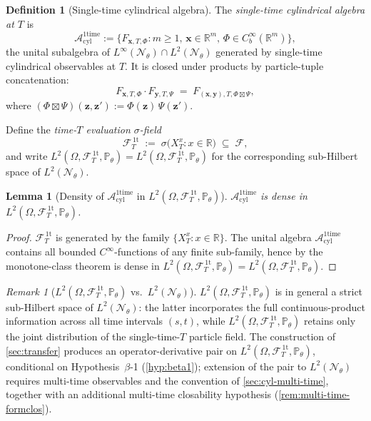 \documentclass[11pt,reqno]{amsart}
\theoremstyle{plain}
\newtheorem{lemma}[theorem]{Lemma}
\theoremstyle{definition}
\newtheorem{definition}[theorem]{Definition}
\theoremstyle{remark}
\newtheorem{remark}[theorem]{Remark}
\newcommand{\R}{\mathbb R}
\newcommand{\Prob}{\mathbb P}
\newcommand{\cA}{\mathcal A}
\newcommand{\cF}{\mathcal F}
\newcommand{\cN}{\mathcal N}
\newcommand{\Aone}{\cA_{\mathrm{cyl}}^{\mathrm{1time}}}
\newcommand{\FT}{\cF_{T}^{\,\mathrm{1t}}}
\newcommand{\Hone}{L^{2}(\Omega,\FT,\Pth)}
\newcommand{\Pth}{\Prob_{\theta}}
\begin{document}
\begin{definition}[Single-time cylindrical algebra]\label{def:Aone}
The \emph{single-time cylindrical algebra at $T$} is
\[
  \Aone
  :=\bigl\{F_{\mathbf x,T,\Phi}:m\ge 1,\,\mathbf x\in\R^{m},\,\Phi\in C_{b}^{\infty}(\R^{m})\bigr\},
\]
the unital subalgebra of
$L^{\infty}(\cN_{\theta})\cap L^{2}(\cN_{\theta})$ generated by
single-time cylindrical observables at $T$. It is closed under
products by particle-tuple concatenation:
\begin{equation}\label{eq:product-rule-1t}
  F_{\mathbf x,T,\Phi}\cdot F_{\mathbf y,T,\Psi}
  \;=\;F_{(\mathbf x,\mathbf y),T,\Phi\boxtimes\Psi},
\end{equation}
where $(\Phi\boxtimes\Psi)(\mathbf z,\mathbf z'):=\Phi(\mathbf z)\,\Psi(\mathbf z')$.
\end{definition}

Define the \emph{time-$T$ evaluation $\sigma$-field}
\begin{equation}\label{eq:F-T-1t}
  \FT\;:=\;\sigma\bigl(X_{T}^{x}:x\in\R\bigr)\;\subseteq\;\cF,
\end{equation}
and write $\Hone=L^{2}(\Omega,\FT,\Pth)$ for the corresponding
sub-Hilbert space of $L^{2}(\cN_{\theta})$.

\begin{lemma}[Density of $\Aone$ in $\Hone$]\label{lem:Aone-dense}
$\Aone$ is dense in $\Hone$.
\end{lemma}

\begin{proof}
$\FT$ is generated by the family $\{X_{T}^{x}:x\in\R\}$. The unital
algebra $\Aone$ contains all bounded $C^{\infty}$-functions of any
finite sub-family, hence by the monotone-class theorem is dense in
$L^{2}(\Omega,\FT,\Pth)=\Hone$.
\end{proof}

\begin{remark}[$\Hone$ vs.\ $L^{2}(\cN_{\theta})$]\label{rem:Hone-vs-Ltheta}
$\Hone$ is in general a strict sub-Hilbert space of
$L^{2}(\cN_{\theta})$: the latter incorporates the full
continuous-product information across all time intervals $(s,t)$,
while $\Hone$ retains only the joint distribution of the
single-time-$T$ particle field. The construction of
\cref{sec:transfer} produces an operator-derivative pair on
$\Hone$, conditional on Hypothesis~$\beta$-1 (\cref{hyp:beta1});
extension of the pair to $L^{2}(\cN_{\theta})$ requires multi-time
observables and the convention of \cref{sec:cyl-multi-time},
together with an additional multi-time closability hypothesis
(\cref{rem:multi-time-formclos}).
\end{remark}
\end{document}
